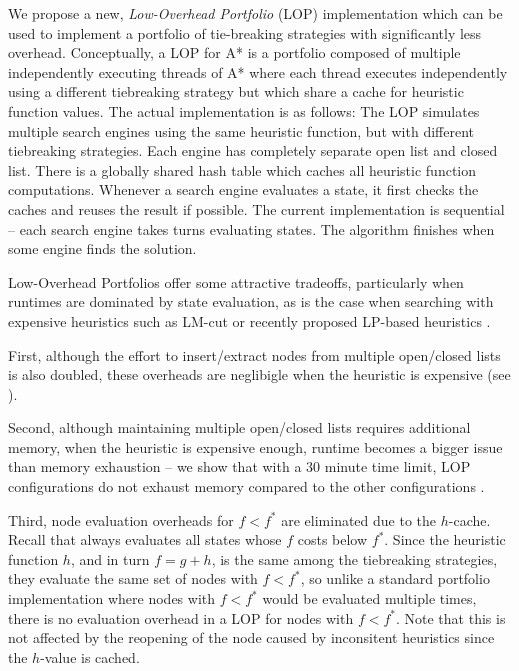 We propose a new, \emph{Low-Overhead Portfolio} (LOP) implementation which can be used to implement a portfolio of tie-breaking strategies with significantly less overhead.
Conceptually, a LOP for A* is a portfolio composed of multiple independently executing threads of A*  where each thread  executes independently using a different tiebreaking strategy but which share a cache for heuristic function values.
The actual implementation is as follows:
The LOP simulates
multiple search engines using the same heuristic function, but with
different tiebreaking strategies.  Each engine has completely separate
open list and closed list.  There is a globally shared hash
table which caches all heuristic function computations.  Whenever a
search engine evaluates a state, it first checks the caches and 
reuses the result if possible.  The current implementation is sequential -- each search engine takes  turns 
evaluating states. The algorithm finishes when some engine finds the solution.


Low-Overhead Portfolios offer some attractive tradeoffs,
particularly when runtimes are dominated by state evaluation, as is the case when searching with 
expensive heuristics such as LM-cut or recently proposed LP-based heuristics \cite{Pommereningetal14}.

First, although the effort to insert/extract nodes from multiple open/closed lists is also doubled, these overheads
are neglibigle when the heuristic is expensive (see ).

Second, although maintaining multiple open/closed lists requires additional memory,
when the heuristic is expensive enough, runtime becomes a bigger issue than memory exhaustion  -- we show that with a 30 minute time limit, LOP configurations do not exhaust memory compared to the other configurations .

Third, node evaluation overheads for $f < f^*$ are eliminated due to the $h$-cache.
Recall that \astar always evaluates all states whose $f$ costs 
below $f^*$. Since the heuristic function $h$, and in turn $f=g+h$, is
the same among the tiebreaking strategies, they evaluate the same set of
nodes with $f<f^*$, so unlike a standard portfolio implementation where 
nodes with $f<f^*$ would be evaluated multiple times, there is no evaluation overhead in a LOP
for nodes with $f<f^*$.
Note that this is not
affected by the reopening of the node caused by inconsitent heuristics
since the $h$-value is cached.


